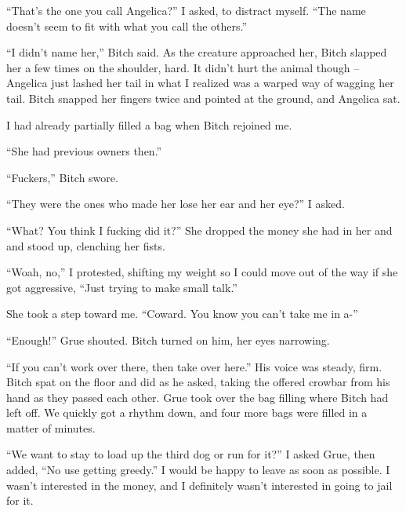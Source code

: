 ``That's the one you call Angelica?'' I asked, to distract myself. ``The name doesn't seem to fit with what you call the others.''



``I didn't name her,'' Bitch said. As the creature approached her, Bitch slapped her a few times on the shoulder, hard. It didn't hurt the animal though – Angelica just lashed her tail in what I realized was a warped way of wagging her tail. Bitch snapped her fingers twice and pointed at the ground, and Angelica sat.



I had already partially filled a bag when Bitch rejoined me.



``She had previous owners then.''



``Fuckers,'' Bitch swore.



``They were the ones who made her lose her ear and her eye?'' I asked.



``What? You think I fucking did it?''  She dropped the money she had in her and and stood up, clenching her fists.



``Woah, no,'' I protested, shifting my weight so I could move out of the way if she got aggressive, ``Just trying to make small talk.''



She took a step toward me.  ``Coward.  You know you can't take me in a-''



``Enough!'' Grue shouted.  Bitch turned on him, her eyes narrowing.



``If you can't work over there, then take over here.''  His voice was steady, firm.  Bitch spat on the floor and did as he asked, taking the offered crowbar from his hand as they passed each other.  Grue took over the bag filling where Bitch had left off.  We quickly got a rhythm down, and four more bags were filled in a matter of minutes.



``We want to stay to load up the third dog or run for it?'' I asked Grue, then added, ``No use getting greedy.'' I would be happy to leave as soon as possible. I wasn't interested in the money, and I definitely wasn't interested in going to jail for it.



